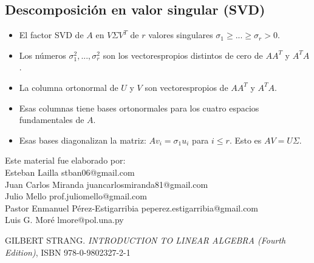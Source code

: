 \documentclass[]{article}
\begin{document}
\subsection{Descomposici\'on en valor singular (SVD)}

\begin{itemize}
	
	\item El factor SVD de $ A $ en $ V\Sigma V^{T} $ de $ r $ valores singulares $ \sigma_{1}\geq ... \geq \sigma_{r} > 0 $.
	
	\item Los n\'umeros $ \sigma^{2}_{1},..., \sigma^{2}_{r} $ son los vectorespropios distintos de cero de $ AA^{T} $ y $ A^{T}A $.
	
	\item La columna ortonormal de $ U $ y $ V $ son vectorespropios de $ AA^{T} $ y $ A^{T}A $. 
	
	\item Esas columnas tiene  bases ortonormales para los cuatro espacios fundamentales de $ A $. 
	
	\item Esas bases diagonalizan la matriz: $ Av_{i}=\sigma_{1}u_{i} $ para $ i \leq r $. Esto es $ AV=U\Sigma $. 
	
	
\end{itemize}

Este material fue elaborado por:\\
 
	Esteban Lailla stban06@gmail.com\\
	Juan Carlos Miranda juancarlosmiranda81@gmail.com\\
	Julio Mello prof.juliomello@gmail.com\\
	Pastor Enmanuel P\'erez-Estigarribia peperez.estigarribia@gmail.com \\
	Luis G. Moré lmore@pol.una.py

\renewcommand{\refname}{Bibliograf\'ia consultada}
\begin{thebibliography}{99}
	
	 GILBERT STRANG.
	\emph{INTRODUCTION TO LINEAR ALGEBRA (Fourth Edition)},
	ISBN 978-0-9802327-2-1
	
	
\end{thebibliography}
\end{document}
